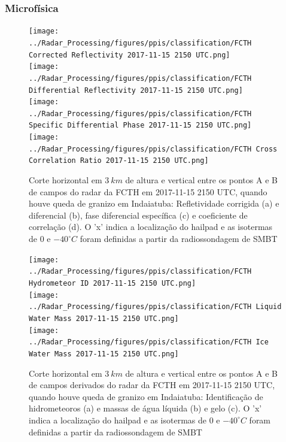 \subsubsection{Microfísica}\label{micro_20171115}

\begin{figure}[hp]
	\centering
	\caption{Corte horizontal em $3\:km$ de altura e vertical entre os pontos A e B de campos do radar da FCTH em 2017-11-15 2150 UTC, quando houve queda de granizo em Indaiatuba: Refletividade corrigida (a) e diferencial (b), fase diferencial específica (c) e coeficiente de correlação (d). O 'x' indica a localização do hailpad e as isotermas de $0$ e $-40^{\circ}C$ foram definidas a partir da radiossondagem de SMBT}
	\label{radar_20171115}
	\vspace{-5pt}
	\texttt{[image: ../Radar\_Processing/figures/ppis/classification/FCTH Corrected Reflectivity 2017-11-15 2150 UTC.png]}
	\label{z_20171115} \\
	\vspace{-15pt}
	\texttt{[image: ../Radar\_Processing/figures/ppis/classification/FCTH Differential Reflectivity 2017-11-15 2150 UTC.png]}
	\label{zdr_20171115} \\
	\vspace{-15pt}
	\texttt{[image: ../Radar\_Processing/figures/ppis/classification/FCTH Specific Differential Phase 2017-11-15 2150 UTC.png]}
	\label{kdp_20171115} \\
	\vspace{-15pt}
	\texttt{[image: ../Radar\_Processing/figures/ppis/classification/FCTH Cross Correlation Ratio 2017-11-15 2150 UTC.png]}
	\label{rho_20171115} \\
	\vspace{-5pt}
\end{figure}

\begin{figure}[htb]
	\centering
	\caption{Corte horizontal em $3\:km$ de altura e vertical entre os pontos A e B de campos derivados do radar da FCTH em 2017-11-15 2150 UTC, quando houve queda de granizo em Indaiatuba: Identificação de hidrometeoros (a) e massas de água líquida (b) e gelo (c). O 'x' indica a localização do hailpad e as isotermas de $0$ e $-40^{\circ}C$ foram definidas a partir da radiossondagem de SMBT} 
	\label{radar_derived_20171115}
	\vspace{-5pt}
	\texttt{[image: ../Radar\_Processing/figures/ppis/classification/FCTH Hydrometeor ID 2017-11-15 2150 UTC.png]}
	\label{hid_20171115} \\
	\vspace{-15pt}
	\texttt{[image: ../Radar\_Processing/figures/ppis/classification/FCTH Liquid Water Mass 2017-11-15 2150 UTC.png]}
	\label{ml_20171115} \\
	\vspace{-15pt}
	\texttt{[image: ../Radar\_Processing/figures/ppis/classification/FCTH Ice Water Mass 2017-11-15 2150 UTC.png]}
	\label{mi_20171115} \\
	\vspace{-5pt}
\end{figure}


